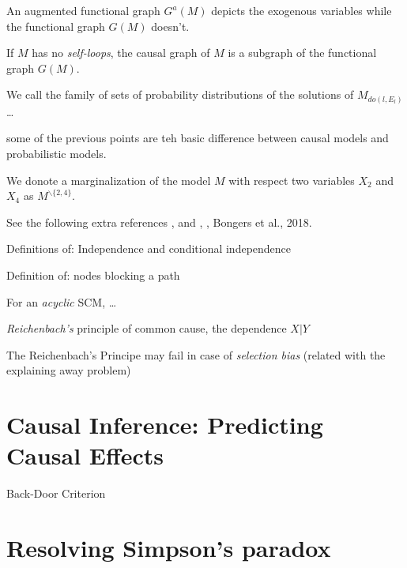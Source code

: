 \documentclass[b5paper]{report}
\begin{document}
An augmented functional graph $G^a(M)$ depicts the exogenous variables while
the functional graph $G(M)$ doesn't.

\begin{mybox}
  If $M$ has no \emph{self-loops}, the causal graph of $M$ is a subgraph of the
  functional graph $G(M)$.
\end{mybox}

\begin{definition}
We call the family of sets of probability distributions of the solutions of
$M_{do(l,E_l)}$ \dots
\end{definition}

some of the previous points are teh basic difference between causal models and
probabilistic models.

We donote a marginalization of the model $M$ with respect two variables $X_2$
and $X_4$ as $M^{\backslash\{2,4\}}$.

See the following extra references \cite{de2013global}, and
\cite{bongers2018random}, \cite{blom2018generalized},
Bongers et al., 2018.


\begin{definition}
  Definitions of: Independence and conditional independence
\end{definition}

\begin{definition}
  Definition of: nodes blocking a path
\end{definition}

\begin{theorem}
  For an \emph{acyclic} SCM, \dots
\end{theorem}

\emph{Reichenbach's} principle of common cause, the dependence $X | Y$

The Reichenbach's Principe may fail in case of \emph{selection bias} (related
with the explaining away problem)


\section{Causal Inference: Predicting Causal Effects}

\begin{theorem}
  Back-Door Criterion \cite{pearl2000causal}
\end{theorem}

\section{Resolving Simpson's paradox}
\end{document}
